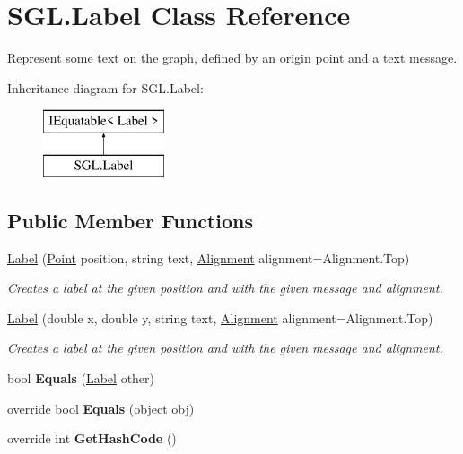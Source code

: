 \hypertarget{class_s_g_l_1_1_label}{}\section{S\+G\+L.\+Label Class Reference}
\label{class_s_g_l_1_1_label}


Represent some text on the graph, defined by an origin point and a text message.  


Inheritance diagram for S\+G\+L.\+Label\+:\begin{figure}[H]
\begin{center}
\leavevmode
\includegraphics[height=2.000000cm]{class_s_g_l_1_1_label}
\end{center}
\end{figure}
\subsection*{Public Member Functions}
\begin{DoxyCompactItemize}
\item 
\mbox{\hyperlink{class_s_g_l_1_1_label_a1be3c869e06d8fc2da560a4fec1be8fd}{Label}} (\mbox{\hyperlink{struct_s_g_l_1_1_point}{Point}} position, string text, \mbox{\hyperlink{namespace_s_g_l_aa8de446c655c151ef21cfe27b24da87c}{Alignment}} alignment=Alignment.\+Top)
\begin{DoxyCompactList}\small\item\em Creates a label at the given position and with the given message and alignment. \end{DoxyCompactList}\item 
\mbox{\hyperlink{class_s_g_l_1_1_label_a11a9b6b3f98a52007ae874d22dc2f348}{Label}} (double x, double y, string text, \mbox{\hyperlink{namespace_s_g_l_aa8de446c655c151ef21cfe27b24da87c}{Alignment}} alignment=Alignment.\+Top)
\begin{DoxyCompactList}\small\item\em Creates a label at the given position and with the given message and alignment. \end{DoxyCompactList}\item 
\mbox{\label{class_s_g_l_1_1_label_a68959b0181bc08450c2a5ba1a30df705}} 
bool {\bfseries Equals} (\mbox{\hyperlink{class_s_g_l_1_1_label}{Label}} other)
\item 
\mbox{\label{class_s_g_l_1_1_label_ab1f388c98f9e912195411337f7287c3c}} 
override bool {\bfseries Equals} (object obj)
\item 
\mbox{\label{class_s_g_l_1_1_label_a256edbbb21ad2232fc73e2f7368b2b1d}} 
override int {\bfseries Get\+Hash\+Code} ()
\end{DoxyCompactItemize}
